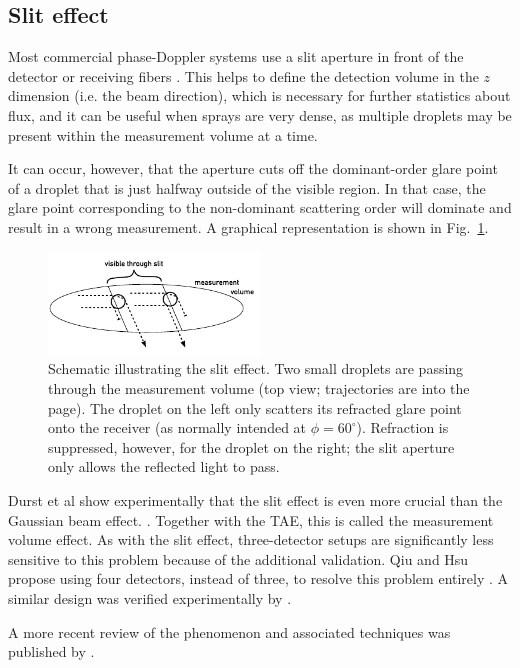 \documentclass[11.5pt,oneside]{book}
\newcommand*{\figref}[1]{Fig.~\ref{#1}}
\begin{document}
\subsection{Slit effect}
Most commercial phase-Doppler systems use a slit aperture in front of the
detector or receiving fibers \cite{Albrecht03}. This helps to define the
detection volume in the $z$ dimension (i.e. the beam direction), which is necessary for further statistics
about flux, and it can be useful when sprays are very dense, as multiple
droplets may be present within the measurement volume at a time.

It can occur, however, that the aperture cuts off the dominant-order glare point
of a droplet that is just halfway outside of the visible region. In that case,
the glare point corresponding to the non-dominant scattering order will
dominate and result in a wrong measurement. A graphical representation is shown
in \figref{fig:sliteffect}. 

\begin{figure}
    \centering
    \includegraphics[width=0.5\textwidth]{img/setup/sliteffect.pdf}
    \caption{Schematic illustrating the slit effect. Two small droplets are
    passing through the measurement volume (top view; trajectories are into the
page). The droplet on the left only scatters its refracted glare point onto the
receiver (as normally intended at $\phi=60^\circ$). Refraction is suppressed,
however, for the droplet on the right; the slit aperture only allows the
reflected light to pass. \label{fig:sliteffect}}
\end{figure}

Durst et al show experimentally that the slit effect is even more crucial than
the Gaussian beam effect. \cite{Durst94}. Together with the TAE, this
is called the measurement volume effect. As with the slit effect, three-detector
setups are significantly less sensitive to this problem because of the
additional validation. Qiu and Hsu propose using four detectors, instead of
three, to resolve this problem entirely \cite{Qiu99}. A similar design was
verified experimentally by \citet{Sipperley14}.

A more recent review of the phenomenon and associated techniques was published by
\citet{Strakey00, Strakey00a}.
\end{document}
